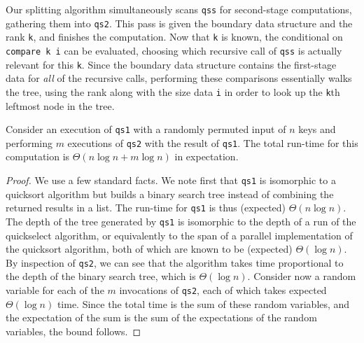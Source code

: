 \begin{abstrsyn}
Our splitting algorithm simultaneously scans \texttt{qss} for second-stage
computations, gathering them into \texttt{qs2}. This pass is given the boundary
data structure and the rank \texttt{k}, and finishes the computation. Now that
\texttt{k} is known, the conditional on \texttt{compare k i} can be evaluated,
choosing which recursive call of \texttt{qss} is actually relevant for this
\texttt{k}. Since the boundary data structure contains the first-stage data for
\emph{all} of the recursive calls, performing these comparisons essentially
walks the tree, using the rank along with the size data \texttt{i} in order to
look up the \texttt{k}th leftmost node in the tree.

\begin{theorem}
  Consider an execution of \texttt{qs1} with a randomly permuted input
  of $n$ keys and performing $m$ executions of \texttt{qs2} with the
  result of \texttt{qs1}.  The total run-time for this computation is
  $\Theta(n\log{n} + m\log{n})$ in expectation.
\end{theorem}
\begin{proof}
  We use a few standard facts.  We note first that \texttt{qs1} is
  isomorphic to a quicksort algorithm but builds a binary search tree
  instead of combining the returned results in a list.  The run-time
  for \texttt{qs1} is thus (expected) $\Theta(n\log{n})$.
%
  The depth of the tree generated by \texttt{qs1} is isomorphic to the
    depth of a run of the quickselect algorithm, or equivalently to the
    span of a parallel implementation of the quicksort algorithm, both
    of which are known to be (expected) $\Theta(\log{n})$.
%
    By inspection of \texttt{qs2}, we can see that the algorithm takes
    time proportional to the depth of the binary search tree, which is
    $\Theta(\log{n})$. Consider now a random variable for each of the
    $m$ invocations of \texttt{qs2}, each of which takes expected
    $\Theta(\log{n})$ time.  Since the total time is the sum of these
    random variables, and the expectation of the sum is the sum of
    the expectations of the random variables, the bound follows.
\end{proof}

\end{abstrsyn}
